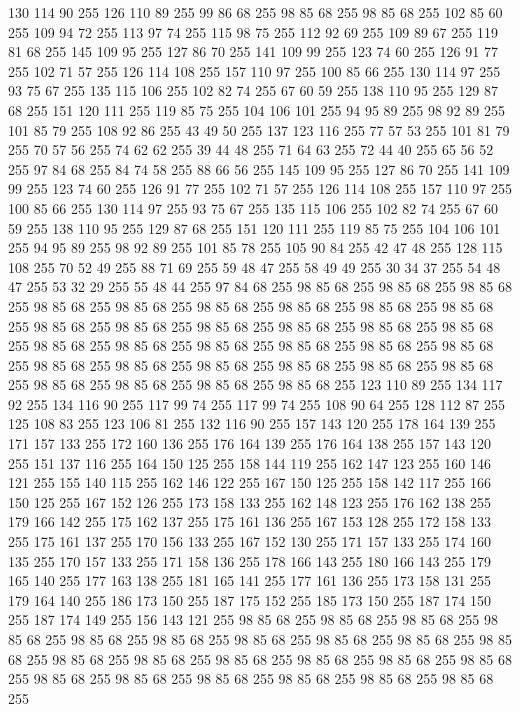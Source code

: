 130 114 90 255 126 110 89 255 99 86 68 255 98 85 68 255 98 85 68 255 102 85 60 255 109 94 72 255 113 97 74 255 115 98 75 255 112 92 69 255 109 89 67 255 119 81 68 255 145 109 95 255 127 86 70 255 141 109 99 255 123 74 60 255 126 91 77 255 102 71 57 255 126 114 108 255 157 110 97 255 100 85 66 255 130 114 97 255 93 75 67 255 135 115 106 255 102 82 74 255 67 60 59 255 138 110 95 255 129 87 68 255 151 120 111 255 119 85 75 255 104 106 101 255 94 95 89 255 98 92 89 255 101 85 79 255 108 92 86 255 43 49 50 255 137 123 116 255 77 57 53 255 101 81 79 255 70 57 56 255 74 62 62 255 39 44 48 255 71 64 63 255 72 44 40 255 65 56 52 255 97 84 68 255 84 74 58 255 88 66 56 255 145 109 95 255 127 86 70 255 141 109 99 255 123 74 60 255 126 91 77 255 102 71 57 255 126 114 108 255 157 110 97 255 100 85 66 255 130 114 97 255 93 75 67 255 135 115 106 255 102 82 74 255 67 60 59 255 138 110 95 255 129 87 68 255
151 120 111 255 119 85 75 255 104 106 101 255 94 95 89 255 98 92 89 255 101 85 78 255 105 90 84 255 42 47 48 255 128 115 108 255 70 52 49 255 88 71 69 255 59 48 47 255 58 49 49 255 30 34 37 255 54 48 47 255 53 32 29 255 55 48 44 255 97 84 68 255 98 85 68 255 98 85 68 255 98 85 68 255 98 85 68 255 98 85 68 255 98 85 68 255 98 85 68 255 98 85 68 255 98 85 68 255 98 85 68 255 98 85 68 255 98 85 68 255 98 85 68 255 98 85 68 255 98 85 68 255 98 85 68 255 98 85 68 255 98 85 68 255 98 85 68 255 98 85 68 255 98 85 68 255 98 85 68 255 98 85 68 255 98 85 68 255 98 85 68 255 98 85 68 255 98 85 68 255 98 85 68 255 98 85 68 255 98 85 68 255 98 85 68 255 123 110 89 255 134 117 92 255 134 116 90 255 117 99 74 255 117 99 74 255 108 90 64 255 128 112 87 255 125 108 83 255 123 106 81 255 132 116 90 255 157 143 120 255 178 164 139 255 171 157 133 255 172 160 136 255 176 164 139 255
176 164 138 255 157 143 120 255 151 137 116 255 164 150 125 255 158 144 119 255 162 147 123 255 160 146 121 255 155 140 115 255 162 146 122 255 167 150 125 255 158 142 117 255 166 150 125 255 167 152 126 255 173 158 133 255 162 148 123 255 176 162 138 255 179 166 142 255 175 162 137 255 175 161 136 255 167 153 128 255 172 158 133 255 175 161 137 255 170 156 133 255 167 152 130 255 171 157 133 255 174 160 135 255 170 157 133 255 171 158 136 255 178 166 143 255 180 166 143 255 179 165 140 255 177 163 138 255 181 165 141 255 177 161 136 255 173 158 131 255 179 164 140 255 186 173 150 255 187 175 152 255 185 173 150 255 187 174 150 255 187 174 149 255 156 143 121 255 98 85 68 255 98 85 68 255 98 85 68 255 98 85 68 255 98 85 68 255 98 85 68 255 98 85 68 255 98 85 68 255 98 85 68 255 98 85 68 255 98 85 68 255 98 85 68 255 98 85 68 255 98 85 68 255 98 85 68 255 98 85 68 255 98 85 68 255 98 85 68 255 98 85 68 255 98 85 68 255 98 85 68 255 98 85 68 255
